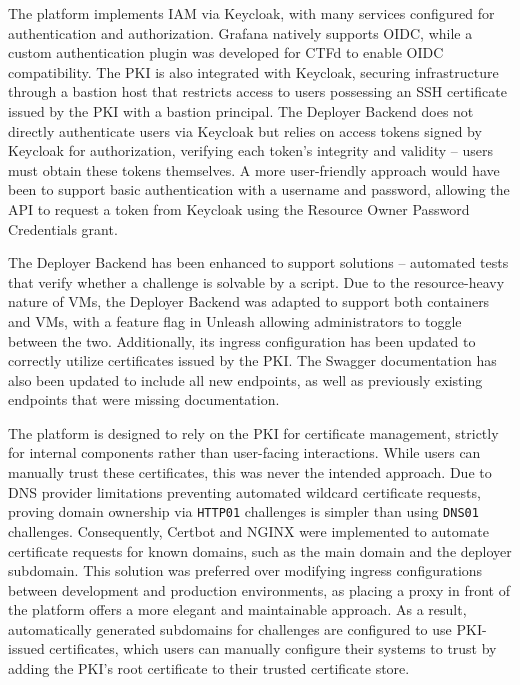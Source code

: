 The platform implements IAM via Keycloak, with many services configured for authentication and authorization. Grafana natively supports OIDC, while a custom authentication plugin was developed for CTFd to enable OIDC compatibility. The PKI is also integrated with Keycloak, securing infrastructure through a bastion host that restricts access to users possessing an SSH certificate issued by the PKI with a bastion principal. The Deployer Backend does not directly authenticate users via Keycloak but relies on access tokens signed by Keycloak for authorization, verifying each token's integrity and validity -- users must obtain these tokens themselves. A more user-friendly approach would have been to support basic authentication with a username and password, allowing the API to request a token from Keycloak using the Resource Owner Password Credentials grant.

The Deployer Backend has been enhanced to support solutions -- automated tests that verify whether a challenge is solvable by a script. Due to the resource-heavy nature of VMs, the Deployer Backend was adapted to support both containers and VMs, with a feature flag in Unleash allowing administrators to toggle between the two. Additionally, its ingress configuration has been updated to correctly utilize certificates issued by the PKI. The Swagger documentation has also been updated to include all new endpoints, as well as previously existing endpoints that were missing documentation.

The platform is designed to rely on the PKI for certificate management, strictly for internal components rather than user-facing interactions. While users can manually trust these certificates, this was never the intended approach. Due to DNS provider limitations preventing automated wildcard certificate requests, proving domain ownership via \texttt{HTTP01} challenges is simpler than using \texttt{DNS01} challenges. Consequently, Certbot and NGINX were implemented to automate certificate requests for known domains, such as the main domain and the deployer subdomain. This solution was preferred over modifying ingress configurations between development and production environments, as placing a proxy in front of the platform offers a more elegant and maintainable approach. As a result, automatically generated subdomains for challenges are configured to use PKI-issued certificates, which users can manually configure their systems to trust by adding the PKI's root certificate to their trusted certificate store.

